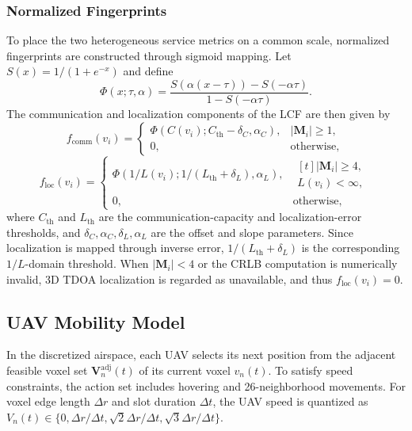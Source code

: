 \documentclass[10pt,journal,letterpaper]{IEEEtran}
\begin{document}
\subsubsection{Normalized Fingerprints}
To place the two heterogeneous service metrics on a common scale, normalized fingerprints are constructed through sigmoid mapping. Let $S(x)=1/(1+e^{-x})$ and define
\begin{equation}
\Phi(x;\tau,\alpha)=\frac{S(\alpha(x-\tau))-S(-\alpha\tau)}{1-S(-\alpha\tau)}.
\end{equation}
The communication and localization components of the LCF are then given by
\begin{equation}
f_{\mathrm{comm}}(v_i)=
\begin{cases}
\Phi(C(v_i);C_{\mathrm{th}}-\delta_C,\alpha_C), & |\mathbf{M}_i|\ge 1,\\
0, & \mathrm{otherwise},
\end{cases}
\end{equation}
\begin{equation}
f_{\mathrm{loc}}(v_i)=
\begin{cases}
\Phi(1/L(v_i);1/(L_{\mathrm{th}}+\delta_L),\alpha_L), & \begin{aligned}[t]|\mathbf{M}_i|\ge 4,\\ L(v_i)<\infty,\end{aligned}\\
0, & \mathrm{otherwise},
\end{cases}
\end{equation}
where $C_{\mathrm{th}}$ and $L_{\mathrm{th}}$ are the communication-capacity and localization-error thresholds, and $\delta_C,\alpha_C,\delta_L,\alpha_L$ are the offset and slope parameters. Since localization is mapped through inverse error, $1/(L_{\mathrm{th}}+\delta_L)$ is the corresponding $1/L$-domain threshold. When $|\mathbf{M}_i|<4$ or the CRLB computation is numerically invalid, 3D TDOA localization is regarded as unavailable, and thus $f_{\mathrm{loc}}(v_i)=0$.

\subsection{UAV Mobility Model}

In the discretized airspace, each UAV selects its next position from the adjacent feasible voxel set $\mathbf{V}_n^{\mathrm{adj}}(t)$ of its current voxel $v_n(t)$. To satisfy speed constraints, the action set includes hovering and 26-neighborhood movements. For voxel edge length $\Delta r$ and slot duration $\Delta t$, the UAV speed is quantized as $V_n(t)\in\{0,\Delta r/\Delta t,\sqrt{2}\Delta r/\Delta t,\sqrt{3}\Delta r/\Delta t\}$.
\end{document}
